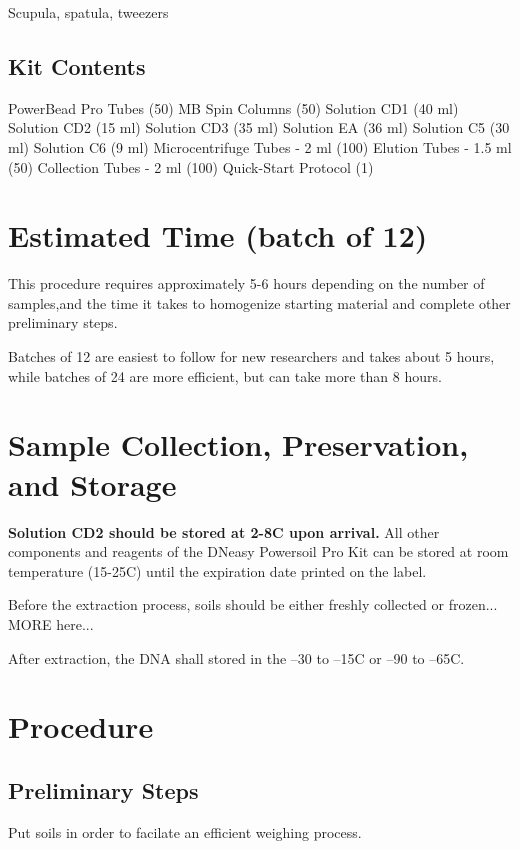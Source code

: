 \documentclass[12pt]{SOP5_beta}\usepackage[]{graphicx}\usepackage[]{xcolor}
\begin{document}
\NP Scupula, spatula, tweezers

\subsection*{Kit Contents}
\NP PowerBead Pro Tubes (50)
\NP MB Spin Columns (50)
\NP Solution CD1 (40 ml)
\NP Solution CD2 (15 ml)
\NP Solution CD3 (35 ml)
\NP Solution EA (36 ml)
\NP Solution C5 (30 ml)
\NP Solution C6 (9 ml)
\NP Microcentrifuge Tubes - 2 ml (100)
\NP Elution Tubes - 1.5 ml (50)
\NP Collection Tubes - 2 ml (100)
\NP Quick-Start Protocol (1)


\section{Estimated Time (batch of 12)}

\NP This procedure requires approximately 5-6 hours depending on the number of samples,and the time it takes to homogenize starting material and complete other preliminary steps.

\NP Batches of 12 are easiest to follow for new researchers and takes about 5 hours, while batches of 24 are more efficient, but can take more than 8 hours.

\section{Sample Collection, Preservation, and Storage}

\NP \textbf{Solution CD2 should be stored at 2-8\degree C upon arrival.} All other components and reagents of the DNeasy Powersoil Pro Kit can be stored at room temperature (15-25\degree C) until the expiration date printed on the label.

\NP Before the extraction process, soils should be either freshly collected or frozen... MORE here...

\NP After extraction, the DNA shall stored in the  –30 to –15\degree C or –90 to –65\degree C.

\section{Procedure}

\subsection*{Preliminary Steps} 
 
\NP Put soils in order to facilate an efficient weighing process. 
\end{document}

